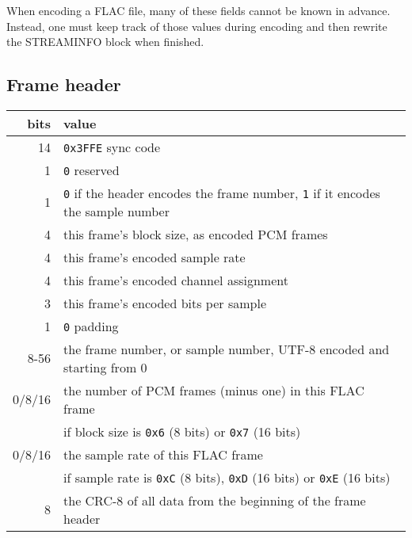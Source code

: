 When encoding a FLAC file, many of these fields cannot be known in advance.
Instead, one must keep track of those values during encoding and then
rewrite the STREAMINFO block when finished.

\subsection{Frame header}

\begin{tabular}{|r|l|}
\hline
bits & value \\
\hline
14 & \texttt{0x3FFE} sync code \\
1 & \texttt{0} reserved \\
1 & \texttt{0} if the header encodes the frame number, \texttt{1} if it encodes the sample number \\
4 & this frame's block size, as encoded PCM frames \\
4 & this frame's encoded sample rate \\
4 & this frame's encoded channel assignment \\
3 & this frame's encoded bits per sample \\
1 & \texttt{0} padding \\
8-56 & the frame number, or sample number, UTF-8 encoded and starting from 0 \\
0/8/16 & the number of PCM frames (minus one) in this FLAC frame \\
& if block size is \texttt{0x6} (8 bits) or \texttt{0x7} (16 bits) \\
0/8/16 & the sample rate of this FLAC frame \\
& if sample rate is \texttt{0xC} (8 bits), \texttt{0xD} (16 bits) or \texttt{0xE} (16 bits) \\
8 & the CRC-8 of all data from the beginning of the frame header \\
\hline
\end{tabular}



